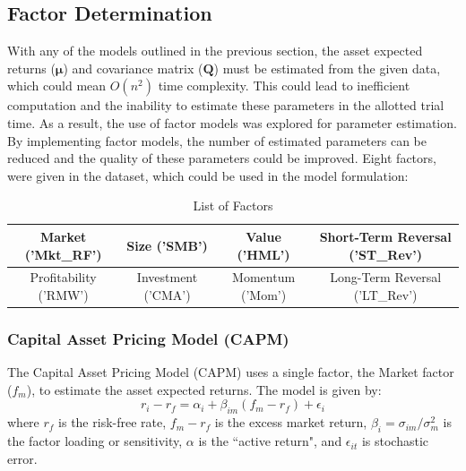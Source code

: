 \documentclass[10pt]{article}
\begin{document}
\subsection{Factor Determination}
With any of the models outlined in the previous section,  the asset expected returns ($\bm{\mu}$) and covariance matrix ($\bm{Q}$) must be estimated from the given data, which could mean $O(n^2)$ time complexity. This could lead to inefficient computation and the inability to estimate these parameters in the allotted trial time.  As a result, the use of factor models was explored for parameter estimation. By implementing factor models,  the number of estimated parameters can be reduced and the quality of these parameters could be improved.  Eight factors, were given in the dataset, which could be used in the model formulation: \bigskip
\begin{table}[!htbp]
\footnotesize
\centering
\begin{tabular}{c c c c } 
\hline 
\rule{0pt}{3.5ex}Market ('Mkt\_RF') & Size ('SMB') & Value ('HML') & Short-Term Reversal  ('ST\_Rev')             \\ [1ex]
\hline
\hline
\rule{0pt}{3.5ex}Profitability ('RMW')& Investment ('CMA')& Momentum ('Mom')& Long-Term Reversal          ('LT\_Rev') \\ [1ex]
\hline
\end{tabular}
\caption{List of Factors}
\label{table:results}
\end{table}
\subsubsection{Capital Asset Pricing Model (CAPM)}
\label{sec:capm}
The Capital Asset Pricing Model (CAPM) uses a single factor, the Market factor ($f_m$), to estimate the asset expected returns. The model is given by:
$$ r_i - r_f = \alpha_i + \beta_{im}(f_m-r_f) + \epsilon_i $$
where $r_f$ is the risk-free rate, $f_m-r_f$ is the excess market return, $\beta_i = \sigma_{im} /\sigma_m^2$ is the factor loading or sensitivity, $\alpha$ is the ``active return", and $\epsilon_{it}$ is stochastic error.
\end{document}
